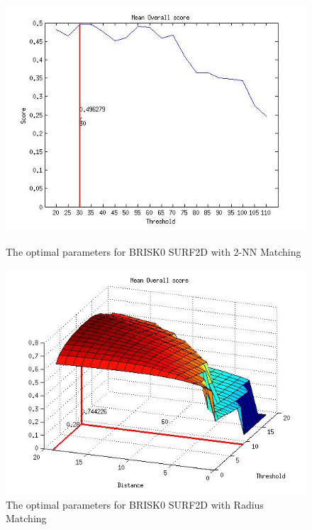 \begin{figure}
\begin{minipage}[b]{0.5\linewidth}
\includegraphics[scale=0.4]{../Drawings/OptimalParameters_SBRISK_SURF2D_KNN.jpg}
\caption{The optimal parameters for BRISK0 SURF2D with 2-NN Matching}
\label{fig:BRISK0surfknnOptimal}
\end{minipage}
\hspace{0.5cm}
\begin{minipage}[b]{0.5\linewidth}
\includegraphics[scale=0.4]{../Drawings/OptimalParameters_SBRISK_SURF2D_Hamming.jpg}
\caption{The optimal parameters for BRISK0 SURF2D with Radius Matching}
\label{fig:BRISK0surfHammingOptimal}
\end{minipage}

\end{figure}
